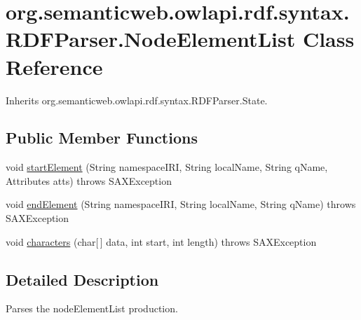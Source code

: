 \hypertarget{classorg_1_1semanticweb_1_1owlapi_1_1rdf_1_1syntax_1_1_r_d_f_parser_1_1_node_element_list}{\section{org.\-semanticweb.\-owlapi.\-rdf.\-syntax.\-R\-D\-F\-Parser.\-Node\-Element\-List Class Reference}
\label{classorg_1_1semanticweb_1_1owlapi_1_1rdf_1_1syntax_1_1_r_d_f_parser_1_1_node_element_list}
}


Inherits org.\-semanticweb.\-owlapi.\-rdf.\-syntax.\-R\-D\-F\-Parser.\-State.

\subsection*{Public Member Functions}
\begin{DoxyCompactItemize}
\item 
void \hyperlink{classorg_1_1semanticweb_1_1owlapi_1_1rdf_1_1syntax_1_1_r_d_f_parser_1_1_node_element_list_a7003e6e09ec59d1c58bce35a62c575a6}{start\-Element} (String namespace\-I\-R\-I, String local\-Name, String q\-Name, Attributes atts)  throws S\-A\-X\-Exception 
\item 
void \hyperlink{classorg_1_1semanticweb_1_1owlapi_1_1rdf_1_1syntax_1_1_r_d_f_parser_1_1_node_element_list_a4be57599225b6192c6b89e9fbe7f4d84}{end\-Element} (String namespace\-I\-R\-I, String local\-Name, String q\-Name)  throws S\-A\-X\-Exception 
\item 
void \hyperlink{classorg_1_1semanticweb_1_1owlapi_1_1rdf_1_1syntax_1_1_r_d_f_parser_1_1_node_element_list_a92d557e758ba525f2a50d842180453d5}{characters} (char\mbox{[}$\,$\mbox{]} data, int start, int length)  throws S\-A\-X\-Exception 
\end{DoxyCompactItemize}


\subsection{Detailed Description}
Parses the node\-Element\-List production. 

